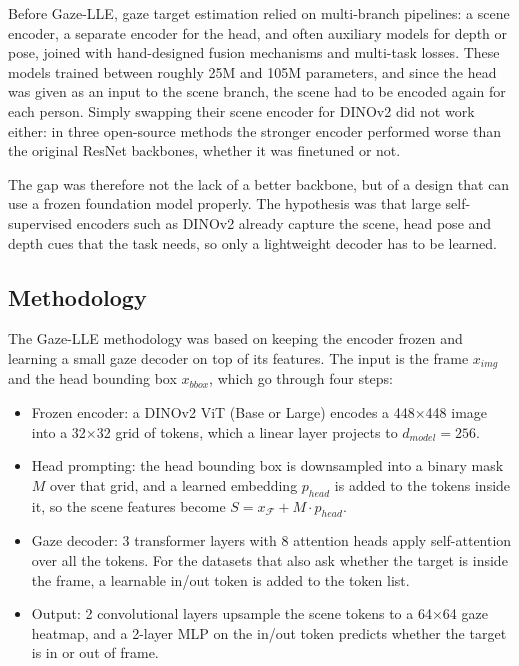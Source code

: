 \documentclass[12pt]{article}
\begin{document}
Before Gaze-LLE, gaze target estimation relied on multi-branch pipelines: a scene encoder, a separate encoder for the head, and often auxiliary models for depth or pose, joined with hand-designed fusion mechanisms and multi-task losses.
These models trained between roughly 25M and 105M parameters, and since the head was given as an input to the scene branch, the scene had to be encoded again for each person.
Simply swapping their scene encoder for DINOv2 did not work either: in three open-source methods the stronger encoder performed worse than the original ResNet backbones, whether it was finetuned or not.

\vspace{0.5cm}

The gap was therefore not the lack of a better backbone, but of a design that can use a frozen foundation model properly. The hypothesis was that large self-supervised encoders such as DINOv2 already capture the scene, head pose and depth cues that the task needs,
so only a lightweight decoder has to be learned.

\vspace{0.5cm}

\subsection*{Methodology}

The Gaze-LLE methodology was based on keeping the encoder frozen and learning a small gaze decoder on top of its features. The input is the frame \(x_{img}\) and the head bounding box \(x_{bbox}\), which go through four steps:
\begin{itemize}
    \item Frozen encoder: a DINOv2 ViT (Base or Large) encodes a 448×448 image into a 32×32 grid of tokens, which a linear layer projects to \(d_{model} = 256\).
    \item Head prompting: the head bounding box is downsampled into a binary mask \(M\) over that grid, and a learned embedding \(p_{head}\) is added to the tokens inside it, so the scene features become \(S = x_{\mathcal{F}} + M \cdot p_{head}\).
    \item Gaze decoder: 3 transformer layers with 8 attention heads apply self-attention over all the tokens. For the datasets that also ask whether the target is inside the frame, a learnable in/out token is added to the token list.
    \item Output: 2 convolutional layers upsample the scene tokens to a 64×64 gaze heatmap, and a 2-layer MLP on the in/out token predicts whether the target is in or out of frame.
\end{itemize}
\end{document}
